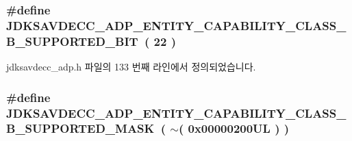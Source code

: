 \subsubsection[{\texorpdfstring{J\+D\+K\+S\+A\+V\+D\+E\+C\+C\+\_\+\+A\+D\+P\+\_\+\+E\+N\+T\+I\+T\+Y\+\_\+\+C\+A\+P\+A\+B\+I\+L\+I\+T\+Y\+\_\+\+C\+L\+A\+S\+S\+\_\+\+B\+\_\+\+S\+U\+P\+P\+O\+R\+T\+E\+D\+\_\+\+B\+IT}{JDKSAVDECC_ADP_ENTITY_CAPABILITY_CLASS_B_SUPPORTED_BIT}}]{\setlength{\rightskip}{0pt plus 5cm}\#define J\+D\+K\+S\+A\+V\+D\+E\+C\+C\+\_\+\+A\+D\+P\+\_\+\+E\+N\+T\+I\+T\+Y\+\_\+\+C\+A\+P\+A\+B\+I\+L\+I\+T\+Y\+\_\+\+C\+L\+A\+S\+S\+\_\+\+B\+\_\+\+S\+U\+P\+P\+O\+R\+T\+E\+D\+\_\+\+B\+IT~( 22 )}\hypertarget{group__adp__entity__capability_ga6d92954f5579a213c5f1bbb650db3cfb}{}\label{group__adp__entity__capability_ga6d92954f5579a213c5f1bbb650db3cfb}


jdksavdecc\+\_\+adp.\+h 파일의 133 번째 라인에서 정의되었습니다.

\subsubsection[{\texorpdfstring{J\+D\+K\+S\+A\+V\+D\+E\+C\+C\+\_\+\+A\+D\+P\+\_\+\+E\+N\+T\+I\+T\+Y\+\_\+\+C\+A\+P\+A\+B\+I\+L\+I\+T\+Y\+\_\+\+C\+L\+A\+S\+S\+\_\+\+B\+\_\+\+S\+U\+P\+P\+O\+R\+T\+E\+D\+\_\+\+M\+A\+SK}{JDKSAVDECC_ADP_ENTITY_CAPABILITY_CLASS_B_SUPPORTED_MASK}}]{\setlength{\rightskip}{0pt plus 5cm}\#define J\+D\+K\+S\+A\+V\+D\+E\+C\+C\+\_\+\+A\+D\+P\+\_\+\+E\+N\+T\+I\+T\+Y\+\_\+\+C\+A\+P\+A\+B\+I\+L\+I\+T\+Y\+\_\+\+C\+L\+A\+S\+S\+\_\+\+B\+\_\+\+S\+U\+P\+P\+O\+R\+T\+E\+D\+\_\+\+M\+A\+SK~( $\sim$( 0x00000200\+U\+L ) )}\hypertarget{group__adp__entity__capability_ga367dfa60ee4b57f99d1a1fa572dc648f}{}\label{group__adp__entity__capability_ga367dfa60ee4b57f99d1a1fa572dc648f}


